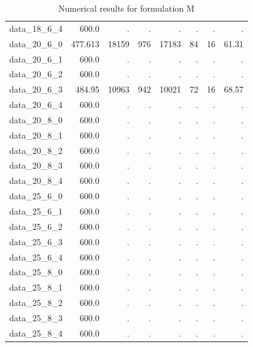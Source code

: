 \documentclass[preprint,12pt,authoryear]{elsarticle}
\begin{document}
\begin{table}[h!]
{\begin{tabular}{rrrrrrrr}
  data\_18\_6\_4 & 600.0 & . & . & . & . & . & . \\
  data\_20\_6\_0 & 477.613 & 18159 & 976 & 17183 & 84 & 16 & 61.31 \\
  data\_20\_6\_1 & 600.0 & . & . & . & . & . & . \\
  data\_20\_6\_2 & 600.0 & . & . & . & . & . & . \\
  data\_20\_6\_3 & 484.95 & 10963 & 942 & 10021 & 72 & 16 & 68.57 \\
  data\_20\_6\_4 & 600.0 & . & . & . & . & . & . \\
  data\_20\_8\_0 & 600.0 & . & . & . & . & . & . \\
  data\_20\_8\_1 & 600.0 & . & . & . & . & . & . \\
  data\_20\_8\_2 & 600.0 & . & . & . & . & . & . \\
  data\_20\_8\_3 & 600.0 & . & . & . & . & . & . \\
  data\_20\_8\_4 & 600.0 & . & . & . & . & . & . \\
  data\_25\_6\_0 & 600.0 & . & . & . & . & . & . \\
  data\_25\_6\_1 & 600.0 & . & . & . & . & . & . \\
  data\_25\_6\_2 & 600.0 & . & . & . & . & . & . \\
  data\_25\_6\_3 & 600.0 & . & . & . & . & . & . \\
  data\_25\_6\_4 & 600.0 & . & . & . & . & . & . \\
  data\_25\_8\_0 & 600.0 & . & . & . & . & . & . \\
  data\_25\_8\_1 & 600.0 & . & . & . & . & . & . \\
  data\_25\_8\_2 & 600.0 & . & . & . & . & . & . \\
  data\_25\_8\_3 & 600.0 & . & . & . & . & . & . \\
  data\_25\_8\_4 & 600.0 & . & . & . & . & . & . \\
  \hline
\end{tabular}
        }
        \caption{Numerical results for formulation M}
    \label{tab:M_results}
\end{table}
\end{document}
